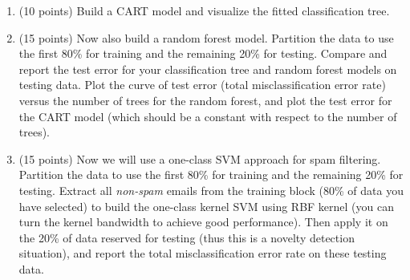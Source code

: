\documentclass[twoside,10pt]{article}
\begin{document}
\begin{enumerate}
\begin{enumerate}

\item (10 points) Build a CART model and visualize the fitted classification tree.

\item (15 points) Now also build a random forest model. Partition the data to use the first 80\% for training and the remaining 20\% for testing. Compare and report the test error for your classification tree and random forest models on testing data. Plot the curve of test error (total misclassification error rate) versus the number of trees for the random forest, and plot the test error for the CART model (which should be a constant with respect to the number of trees). 

\item (15 points) Now we will use a one-class SVM approach for spam filtering. Partition the data to use the first 80\% for training and the remaining 20\% for testing. Extract all {\it non-spam} emails from the training block (80\% of data you have selected) to build the one-class kernel SVM using RBF kernel (you can turn the kernel bandwidth to achieve good performance). Then apply it on the 20\% of data reserved for testing (thus this is a novelty detection situation), and report the total misclassification error rate on these testing data. 

\end{enumerate}


\end{enumerate}
\end{document}
